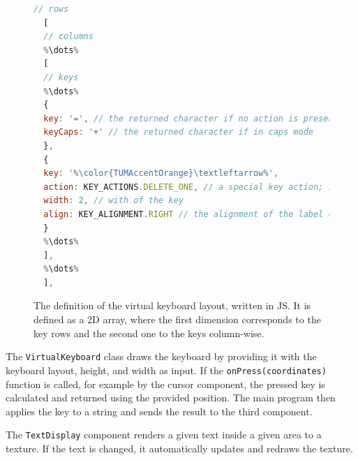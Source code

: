 \begin{figure}[H]
\begin{lstlisting}[language=JavaScript]
  // rows
  [
  // columns
  %\dots%
  [ 
  // keys
  %\dots%
  {
  key: '=', // the returned character if no action is present otherwise just a label
  keyCaps: '+' // the returned character if in caps mode 
  },
  {
  key: '%\color{TUMAccentOrange}\textleftarrow%',
  action: KEY_ACTIONS.DELETE_ONE, // a special key action; in this case, it deletes the last character
  width: 2, // with of the key
  align: KEY_ALIGNMENT.RIGHT // the alignment of the label on the key
  }
  %\dots%
  ],
  %\dots%
  ],
  \end{lstlisting}
  \caption[Virtual keyboard layout definition]{The definition of the virtual keyboard layout, written in \ac{JS}. It is defined as a \ac{2D} array, where the first dimension corresponds to the key rows and the second one to the keys column-wise.}\label{fig:virtual-keyboard-layout}
\end{figure}

The \lstinline{VirtualKeyboard} class draws the keyboard by providing it with the keyboard layout, height, and width as input. If the \lstinline{onPress(coordinates)} function is called, for example by the cursor component, the pressed key is calculated and returned using the provided position. The main program then applies the key to a string and sends the result to the third component. %

The \lstinline{TextDisplay} component renders a given text inside a given area to a texture. If the text is changed, it automatically updates and redraws the texture.
